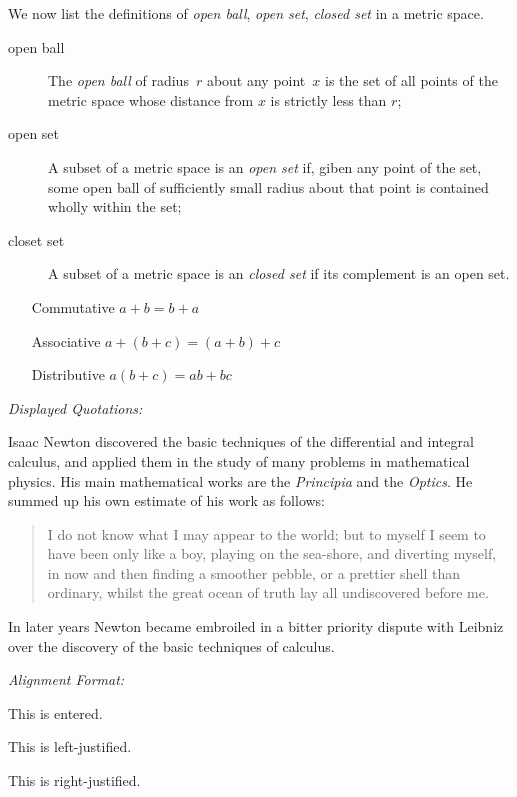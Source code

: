 \documentclass[12pt]{article}
\begin{document}
We now list the definitions of \emph{open ball}, \emph{open set}, \emph{closed set} in a metric space.
\begin{description}
\item[open ball]
The \emph{open ball} of radius~$r$ about any point~$x$ is the set of all points of the metric space whose distance from $x$ is strictly less than $r$;
\item[open set]
A subset of a metric space is an \emph{open set} if, giben any point of the set, some open ball of sufficiently small radius about that point is contained wholly within the set;
\item[closet set]
A subset of a metric space is an \emph{closed set} if its complement is an open set. 
\end{description}

\begin{enumerate}
\item[Commutative] $a+b=b+a$
\item[Associative] $a+(b+c)=(a+b)+c$
\item[Distributive] $a(b+c)=ab+bc$ \\
\end{enumerate}

\noindent
\begin{large}\textit{Displayed Quotations:}\end{large}

Isaac Newton discovered the basic techniques of the differential and integral calculus, and applied them in the study of many problems in mathematical physics. His main mathematical works are the \emph{Principia} and the \emph{Optics}. He summed up his own estimate of his work as follows:
\begin{quote}
I do not know what I may appear to the world; but to myself I seem to have been only like a boy, playing on the sea-shore, and diverting myself, in now and then finding a smoother pebble, or a prettier shell than ordinary, whilst the great ocean of truth lay all undiscovered before me.
\end{quote}
In later years Newton became embroiled in a bitter priority dispute with Leibniz over the discovery of the basic techniques of calculus. \\

\noindent
\begin{large}\textit{Alignment Format:}\end{large}

\begin{center}This is entered.\end{center}
\begin{flushleft}This is left-justified.\end{flushleft}
\begin{flushright}This is right-justified.\end{flushright} 
\end{document}
